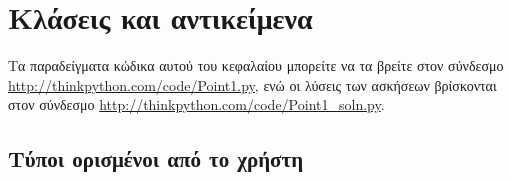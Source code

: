 \documentclass[10pt]{book}
\begin{document}









 
\chapter{Κλάσεις και αντικείμενα}

Τα παραδείγματα κώδικα αυτού του κεφαλαίου μπορείτε να τα βρείτε στον σύνδεσμο
\url{http://thinkpython.com/code/Point1.py}, ενώ οι λύσεις των ασκήσεων βρίσκονται 
στον σύνδεσμο \url{http://thinkpython.com/code/Point1_soln.py}.


 
\section{Τύποι ορισμένοι από το χρήστη}
\label{point}
\end{document}
